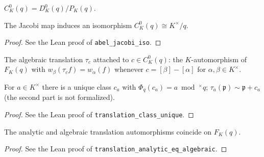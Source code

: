 \begin{definition}
\label{def:C0q}
\leanok
$C^0_K(q)=D^0_K(q)/P_K(q)$.
\end{definition}

\begin{theorem}
\label{thm:abel-jacobi-iso}
\leanok
The Jacobi map induces an isomorphism $C^0_K(q)\cong K^\times/q$.
\end{theorem}
\begin{proof}
\leanok
See the Lean proof of \texttt{abel\_jacobi\_iso}.
\end{proof}

\begin{definition}
\label{def:translation-class}
\leanok
The algebraic translation $\tau_c$ attached to $c\in C^0_K(q)$: the $K$-automorphism of $F_K(q)$ with $w_\beta(\tau_c f)=w_\alpha(f)$ whenever $c=[\beta]-[\alpha]$ for $\alpha,\beta\in K^\times$.
\end{definition}

\begin{corollary}[Corollary Va]
\label{cor:translation-Va}
\leanok
For $a\in K^\times$ there is a unique class $c_a$ with $\Phi_q(c_a)=a\bmod^\times q$; $\tau_a(\mathfrak p)\sim\mathfrak p+c_a$ (the second part is not formalized).
\end{corollary}
\begin{proof}
\leanok
See the Lean proof of \texttt{translation\_class\_unique}.
\end{proof}

\begin{corollary}[Corollary Vb]
\label{cor:translation-Vb}
\leanok
The analytic and algebraic translation automorphisms coincide on $F_K(q)$.
\end{corollary}
\begin{proof}
\leanok
See the Lean proof of \texttt{translation\_analytic\_eq\_algebraic}.
\end{proof}

